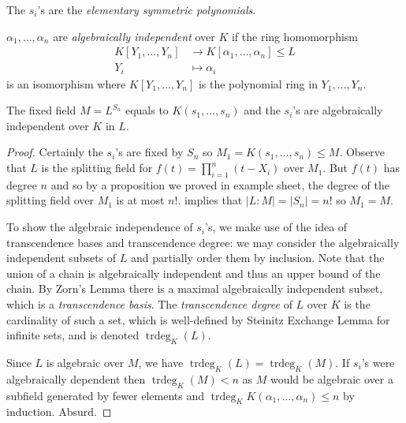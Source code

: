 \documentclass[a4paper]{article}
\DeclareMathOperator{\trdeg}{trdeg}
\begin{document}
\begin{definition}
  The \(s_i\)'s are the \emph{elementary symmetric polynomials}.
\end{definition}

\begin{definition}
  \(\alpha_1, \dots, \alpha_n\) are \emph{algebraically independent} over \(K\) if the ring homomorphism
    \begin{align*}
      K[Y_1, \dots, Y_n] &\to K[\alpha_1, \dots, \alpha_n] \leq L \\
      Y_i &\mapsto \alpha_i
    \end{align*}
    is an isomorphism where \(K[Y_1, \dots, Y_n]\) is the polynomial ring in \(Y_1, \dots, Y_n\).
\end{definition}

\begin{theorem}
  The fixed field \(M = L^{S_n}\) equals to \(K(s_1, \dots, s_n)\) and the \(s_i\)'s are algebraically independent over \(K\) in \(L\).
\end{theorem}

\begin{proof}
  Certainly the \(s_i\)'s are fixed by \(S_n\) so \(M_1 = K(s_1, \dots, s_n) \leq M\). Observe that \(L\) is the splitting field for \(f(t) = \prod_{i = 1}^n (t - X_i)\) over \(M_1\). But \(f(t)\) has degree \(n\) and so by a proposition we proved in example sheet, the degree of the splitting field over \(M_1\) is at most \(n!\).  implies that \(|L:M| = |S_n| = n!\) so \(M_1 = M\).

  To show the algebraic independence of \(s_i\)'s, we make use of the idea of transcendence bases and transcendence degree: we may consider the algebraically independent subsets of \(L\) and partially order them by inclusion. Note that the union of a chain is algebraically independent and thus an upper bound of the chain. By Zorn's Lemma there is a maximal algebraically independent subset, which is a \emph{transcendence basis}. The \emph{transcendence degree} of \(L\) over \(K\) is the cardinality of such a set, which is well-defined by Steinitz Exchange Lemma for infinite sets, and is denoted \(\trdeg_K(L)\).

  Since \(L\) is algebraic over \(M\), we have \(\trdeg_K(L) = \trdeg_K(M)\). If \(s_i\)'s were algebraically dependent then \(\trdeg_K(M) < n\) as \(M\) would be algebraic over a subfield generated by fewer elements and \(\trdeg_K K(\alpha_1, \dots, \alpha_n) \leq n\) by induction. Absurd.
\end{proof}
\end{document}
